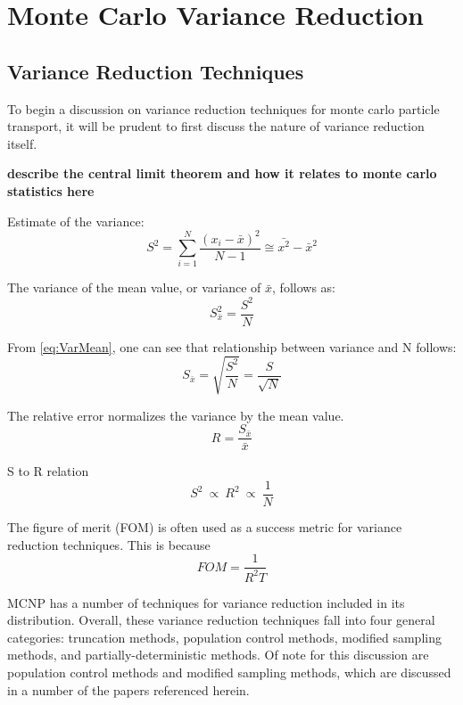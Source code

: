 \section{Monte Carlo Variance Reduction}

\subsection{Variance Reduction Techniques}
\label{sec:MCvar}

To begin a discussion on variance reduction techniques for monte carlo particle transport, it will be prudent to first discuss the nature of variance reduction itself. 

\textbf{describe the central limit theorem and how it relates to monte carlo statistics here }

Estimate of the variance: 
\begin{equation}
S^{ 2 }=\sum _{ i=1 }^{ N }{ \frac { (x_{ i }-\bar { x } )^{ 2 } }{ N-1 }  } \cong \bar{x^2}-\bar{x}^2
\end{equation}
\label{eq:Var}

The variance of the mean value, or variance of $\bar{x}$, follows as:
\begin{equation}
S^{ 2 }_{ \bar { x }  }=\frac{S^2}{N}
\end{equation}
\label{eq:VarMean}

From \ref{eq:VarMean}, one can see that relationship between variance and N follows: 
\begin{equation}
S_{ \bar { x }  }=\sqrt { \frac { S^{ 2 } }{ N }  } =\frac { S }{ \sqrt { N }  }
\end{equation} 
\label{eq:VarN}

The relative error normalizes the variance by the mean value. 
\begin{equation}
R = \frac{S_{ \bar { x }  }}{\bar{x}}
\end{equation}
\label{eq:RelativeErr}

S to R relation
\begin{equation}
S^2\:\propto\: R^2\:\propto\:\frac{1}{N}
\end{equation}
\label{eq:S to R}

The figure of merit (FOM) is often used as a success metric for variance reduction techniques. 
This is because
\begin{equation}
FOM=\frac { 1 }{ R^{ 2 }T } 
\end{equation}
\label{eq:FOM}

MCNP \cite{hendricks_mcnp_1985, brown_mcnp_2002} has a number of techniques for variance
reduction included in its distribution. Overall, these variance reduction techniques fall
 into four general categories: truncation methods, population control methods, modified 
 sampling methods, and partially-deterministic methods. Of note for this discussion are 
 population control methods and modified sampling methods, which are discussed in a number 
 of the papers referenced herein. 

